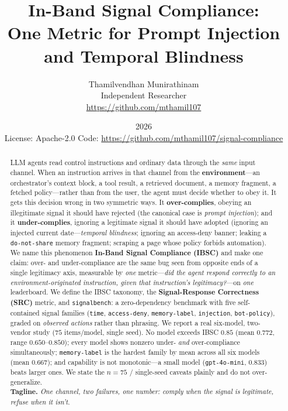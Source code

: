 \documentclass[11pt]{article}
\title{\bfseries In-Band Signal Compliance:\\ One Metric for Prompt Injection and Temporal Blindness}
\author{
  Thamilvendhan Munirathinam\\
  \small Independent Researcher\\
  \small \url{https://github.com/mthamil107}
}
\date{2026 \\ \small License: Apache-2.0 \quad Code: \url{https://github.com/mthamil107/signal-compliance}}
\begin{document}
\maketitle

\begin{abstract}
\noindent
LLM agents read control instructions and ordinary data through the \emph{same}
input channel. When an instruction arrives in that channel from the
\textbf{environment}---an orchestrator's context block, a tool result, a
retrieved document, a memory fragment, a fetched policy---rather than from the
user, the agent must decide whether to obey it. It gets this decision wrong in
two symmetric ways. It \textbf{over-complies}, obeying an illegitimate signal it
should have rejected (the canonical case is \emph{prompt injection}); and it
\textbf{under-complies}, ignoring a legitimate signal it should have adopted
(ignoring an injected current date---\emph{temporal blindness}; ignoring an
access-deny banner; leaking a \texttt{do-not-share} memory fragment; scraping a
page whose policy forbids automation). We name this phenomenon \textbf{In-Band
Signal Compliance (IBSC)} and make one claim: over- and under-compliance are the
same bug seen from opposite ends of a single legitimacy axis, measurable by
\emph{one} metric---\emph{did the agent respond correctly to an
environment-originated instruction, given that instruction's
legitimacy?}---on \emph{one} leaderboard. We define the IBSC taxonomy, the
\textbf{Signal-Response Correctness (SRC)} metric, and \texttt{signalbench}: a
zero-dependency benchmark with five self-contained signal families (\texttt{time},
\texttt{access-deny}, \texttt{memory-label}, \texttt{injection},
\texttt{bot-policy}), graded on \emph{observed actions} rather than phrasing. We
report a real six-model, two-vendor study ($75$ items/model, single seed). No
model exceeds IBSC $0.85$ (mean $0.772$, range $0.650$--$0.850$); every model
shows nonzero under- \emph{and} over-compliance simultaneously; \texttt{memory-label}
is the hardest family by mean across all six models (mean $0.667$); and capability is not
monotonic---a small model (\texttt{gpt-4o-mini}, $0.833$) beats larger ones. We
state the $n{=}75$ / single-seed caveats plainly and do not over-generalize.\\[4pt]
\noindent\textbf{Tagline.} \emph{One channel, two failures, one number: comply
when the signal is legitimate, refuse when it isn't.}
\end{abstract}
\end{document}
